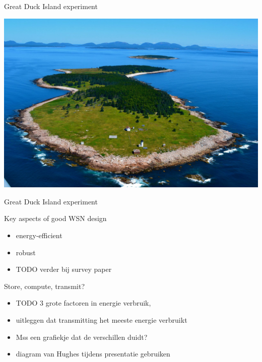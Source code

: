 \documentclass[presentation, bigger]{beamer}
\begin{document}
\begin{frame}[label=sec-1-3]{Great Duck Island experiment}

\includegraphics[width=\textwidth,keepaspectration=true]{gdi/gdi.jpg}

\end{frame}

\begin{frame}[label=sec-1-4]{Great Duck Island experiment}

\end{frame}

\begin{frame}[label=sec-1-5]{Key aspects of good WSN design}
\begin{itemize}
\item energy-efficient
\item robust
\item TODO verder bij survey paper
\end{itemize}
\end{frame}

\begin{frame}[label=sec-1-6]{Store, compute, transmit?}
\begin{itemize}
\item TODO 3 grote factoren in energie verbruik,
\item uitleggen dat transmitting het meeste energie verbruikt
\item Mss een grafiekje dat de verschillen duidt?
\item diagram van Hughes tijdens presentatie gebruiken
\end{itemize}
\end{frame}
\end{document}
